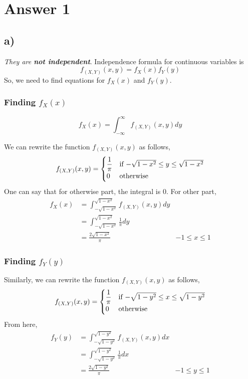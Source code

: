 \section*{Answer 1}

\subsection*{a)}

\noindent \textit{They are \textbf{not independent}}. Independence formula for continuous variables is
\begin{equation*}
    f_{(X, Y)} (x, y) = f_X(x) f_Y(y)
\end{equation*}
So, we need to find equations for $f_X(x)$ and $f_Y(y)$.

\subsubsection*{Finding $f_X(x)$}

\begin{equation*}
    f_X(x) = \int_{-\infty}^{\infty} f_{(X, Y)} (x, y) dy
\end{equation*}

\noindent We can rewrite the function $f_{(X, Y)}(x, y)$ as follows,
\begin{equation*}
    f_{(X, Y)}(x, y) = \begin{cases}
        \dfrac{1}{\pi} &\textnormal{if $-\sqrt{1-x^2} \leq y \leq \sqrt{1-x^2}$}\\
        0 &\textnormal{otherwise}
    \end{cases}
\end{equation*}
One can say that for otherwise part, the integral is 0. For other part,
\begin{align*}
    f_X(x) &= \int_{-\sqrt{1-x^2}}^{\sqrt{1-x^2}} f_{(X, Y)}(x, y) dy\\
         &= \int_{-\sqrt{1-x^2}}^{\sqrt{1-x^2}} \frac{1}{\pi} dy\\
         &= \frac{2\sqrt{1-x^2}}{\pi} &-1 \leq x \leq 1
\end{align*}

\subsubsection*{Finding $f_Y(y)$}

\noindent Similarly, we can rewrite the function $f_{(X, Y)}(x, y)$ as follows,
\begin{equation*}
    f_{(X, Y)}(x, y) = \begin{cases}
        \dfrac{1}{\pi} &\textnormal{if $-\sqrt{1-y^2} \leq x \leq \sqrt{1-y^2}$}\\
        0 &\textnormal{otherwise}
    \end{cases}
\end{equation*}
From here,
\begin{align*}
    f_Y(y) &= \int_{-\sqrt{1-y^2}}^{\sqrt{1-y^2}} f_{(X, Y)}(x, y) dx\\
         &= \int_{-\sqrt{1-y^2}}^{\sqrt{1-y^2}} \frac{1}{\pi} dx\\
         &= \frac{2\sqrt{1-y^2}}{\pi} &-1 \leq y \leq 1
\end{align*}

